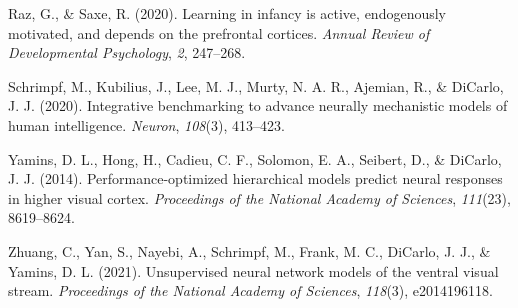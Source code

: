 \documentclass[10pt, letterpaper]{article}
\newenvironment{CSLReferences}%
  {}%
  {\par}
\begin{document}
\begin{CSLReferences}{1}{0}
\leavevmode{}%
Raz, G., \& Saxe, R. (2020). Learning in infancy is active, endogenously
motivated, and depends on the prefrontal cortices. \emph{Annual Review
of Developmental Psychology}, \emph{2}, 247--268.

\leavevmode{}%
Schrimpf, M., Kubilius, J., Lee, M. J., Murty, N. A. R., Ajemian, R., \&
DiCarlo, J. J. (2020). Integrative benchmarking to advance neurally
mechanistic models of human intelligence. \emph{Neuron}, \emph{108}(3),
413--423.

\leavevmode{}%
Yamins, D. L., Hong, H., Cadieu, C. F., Solomon, E. A., Seibert, D., \&
DiCarlo, J. J. (2014). Performance-optimized hierarchical models predict
neural responses in higher visual cortex. \emph{Proceedings of the
National Academy of Sciences}, \emph{111}(23), 8619--8624.

\leavevmode{}%
Zhuang, C., Yan, S., Nayebi, A., Schrimpf, M., Frank, M. C., DiCarlo, J.
J., \& Yamins, D. L. (2021). Unsupervised neural network models of the
ventral visual stream. \emph{Proceedings of the National Academy of
Sciences}, \emph{118}(3), e2014196118.

\end{CSLReferences}


\end{document}
